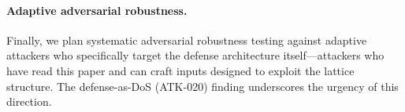 \paragraph{Adaptive adversarial robustness.}
Finally, we plan systematic adversarial robustness testing against
adaptive attackers who specifically target the defense architecture
itself---attackers who have read this paper and can craft inputs
designed to exploit the lattice structure.  The defense-as-DoS
(ATK-020) finding underscores the urgency of this direction.
